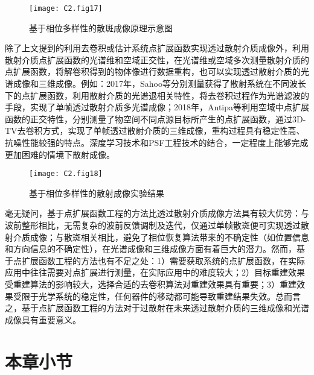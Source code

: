 \begin{figure}[htp]
	\centering
	\texttt{[image: C2.fig17]}
	\caption{基于相位多样性的散斑成像原理示意图}
	\label{fig2:17}
\end{figure}

除了上文提到的利用去卷积或估计系统点扩展函数实现透过散射介质成像外，利用散射介质点扩展函数的光谱维和空域正交性，在光谱维或空域多次测量散射介质的点扩展函数，将解卷积得到的物体像进行数据重构，也可以实现透过散射介质的光谱成像和三维成像。例如：2017年，Sahoo等\cite{sahoo_single-shot_2017}分别测量获得了散射系统在不同波长下的点扩展函数，利用散射介质的光谱退相关特性，将去卷积过程作为光谱滤波的手段，实现了单帧透过散射介质多光谱成像；2018年，Antipa等\cite{antipa_diffusercam_2018}利用空域中点扩展函数的正交特性，分别测量了物空间不同点源目标所产生的点扩展函数，通过3D-TV去卷积方式，实现了单帧透过散射介质的三维成像，重构过程具有稳定性高、抗噪性能较强的特点。深度学习技术和PSF工程技术的结合\cite{yanny_deep_2022}，一定程度上能够完成更加困难的情境下散射成像。

\begin{figure}[htp]
	\centering
	\texttt{[image: C2.fig18]}
	\caption{基于相位多样性的散射成像实验结果}
	\label{fig2:18}
\end{figure}

毫无疑问，基于点扩展函数工程的方法比透过散射介质成像方法具有较大优势：与波前整形相比，无需复杂的波前反馈调制及迭代，仅通过单帧散斑便可实现透过散射介质成像；与散斑相关相比，避免了相位恢复算法带来的不确定性（如位置信息和方向信息的不确定性），在光谱成像和三维成像方面有着巨大的潜力。然而，基于点扩展函数工程的方法也有不足之处：1）需要获取系统的点扩展函数，在实际应用中往往需要对点扩展进行测量，在实际应用中的难度较大；2）目标重建效果受重建算法的影响较大，选择合适的去卷积算法对重建效果具有重要；3）重建效果受限于光学系统的稳定性，任何器件的移动都可能导致重建结果失效。总而言之，基于点扩展函数工程的方法对于过散射在未来透过散射介质的三维成像和光谱成像具有重要意义。

\section{本章小节}

